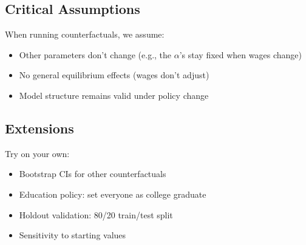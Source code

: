 \documentclass[12pt,english]{article}
\begin{document}
\subsection{Critical Assumptions}
When running counterfactuals, we assume:
\begin{itemize}
    \item Other parameters don't change (e.g., the $\alpha$'s stay fixed when wages change)
    \item No general equilibrium effects (wages don't adjust)
    \item Model structure remains valid under policy change
\end{itemize}

\subsection{Extensions}
Try on your own:
\begin{itemize}
\item Bootstrap CIs for other counterfactuals
\item Education policy: set everyone as college graduate
\item Holdout validation: 80/20 train/test split
\item Sensitivity to starting values
\end{itemize}
\end{document}
